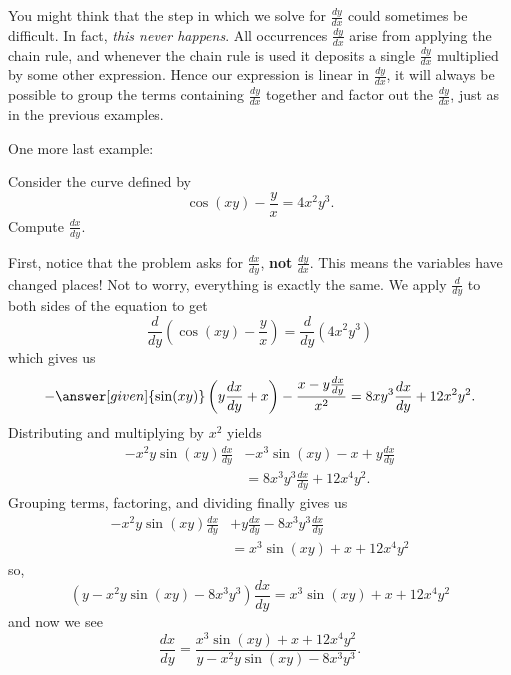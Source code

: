 \documentclass{ximera}
\begin{document}
\begin{example}
\begin{explanation}
\begin{image}
\end{image}
\end{explanation}

\end{example}


You might think that the step in which we solve for $\frac{dy}{dx}$ could
sometimes be difficult. In fact, \textit{this never happens}. All
occurrences $\frac{dy}{dx}$ arise from applying the chain rule, and
whenever the chain rule is used it deposits a single $\frac{dy}{dx}$
multiplied by some other expression. Hence our expression is linear in
$\frac{dy}{dx}$, it will always be possible to group the terms containing
$\frac{dy}{dx}$ together and factor out the $\frac{dy}{dx}$, just as in the
previous examples.

One more last example:

\begin{example}
Consider the curve defined by
\[
\cos(xy) - \frac{y}{x} = 4x^2 y^3.
\]
Compute $\frac{dx}{dy}$.
\begin{explanation}
First, notice that the problem asks for $\frac{dx}{dy}$, \textbf{not}
$\frac{dy}{dx}$. This
means the variables have changed places!  Not to worry, everything is
exactly the same.  We apply $\frac{d}{dy}$ to both sides of the equation to
get
\[
\frac{d}{dy} \left( \cos(xy) - \frac{y}{x} \right) = \frac{d}{dy} (4x^2 y^3)
\]
which gives us
\[
-\answer[given]{\sin(xy)} \left(y \frac{dx}{dy} + x \right) - \frac{x - y \frac{dx}{dy}}{x^2}
= 8xy^3 \frac{dx}{dy} + 12 x^2 y^2.
\]
Distributing and multiplying by $x^2$ yields
\begin{align*}
  -x^2 y \sin(xy) \frac{dx}{dy} &- x^3 \sin(xy) - x + y \frac{dx}{dy}\\
  &= 8x^3y^3 \frac{dx}{dy} + 12x^4y^2.
\end{align*}
Grouping terms, factoring, and dividing finally gives us
\begin{align*}
  -x^2 y \sin(xy) \frac{dx}{dy} &+ y \frac{dx}{dy} - 8x^3y^3 \frac{dx}{dy} \\
  &= x^3 \sin(xy) + x + 12x^4 y^2
\end{align*}
so,
\[
\left( y - x^2y\sin(xy) - 8x^3 y^3 \right) \frac{dx}{dy} = x^3 \sin(xy) + x + 12x^4 y^2 
\]
and now we see
\[
\frac{dx}{dy}= \frac{x^3 \sin(xy) + x + 12x^4 y^2}{y - x^2y\sin(xy) - 8x^3 y^3}.
\]
\end{explanation}
\end{example}
\end{document}
